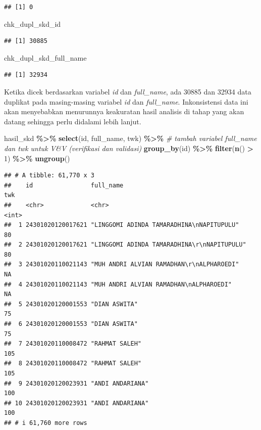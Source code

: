 \documentclass[
]{article}
\newenvironment{Shaded}{\begin{snugshade}}{\end{snugshade}}
\newcommand{\CommentTok}[1]{\textcolor[rgb]{0.56,0.35,0.01}{\textit{#1}}}
\newcommand{\DecValTok}[1]{\textcolor[rgb]{0.00,0.00,0.81}{#1}}
\newcommand{\FunctionTok}[1]{\textcolor[rgb]{0.13,0.29,0.53}{\textbf{#1}}}
\newcommand{\NormalTok}[1]{#1}
\newcommand{\SpecialCharTok}[1]{\textcolor[rgb]{0.81,0.36,0.00}{\textbf{#1}}}
\begin{document}
\begin{verbatim}
## [1] 0
\end{verbatim}

\begin{Shaded}
\begin{Highlighting}[]
\NormalTok{chk\_dupl\_skd\_id}
\end{Highlighting}
\end{Shaded}

\begin{verbatim}
## [1] 30885
\end{verbatim}

\begin{Shaded}
\begin{Highlighting}[]
\NormalTok{chk\_dupl\_skd\_full\_name}
\end{Highlighting}
\end{Shaded}

\begin{verbatim}
## [1] 32934
\end{verbatim}

Ketika dicek berdasarkan variabel \emph{id} dan \emph{full\_name}, ada
30885 dan 32934 data duplikat pada masing-masing variabel \emph{id} dan
\emph{full\_name}. Inkonsistensi data ini akan menyebabkan menurunnya
keakuratan hasil analisis di tahap yang akan datang sehingga perlu
didalami lebih lanjut.

\begin{Shaded}
\begin{Highlighting}[]
\NormalTok{hasil\_skd }\SpecialCharTok{\%\textgreater{}\%} 
  \FunctionTok{select}\NormalTok{(id, full\_name, twk) }\SpecialCharTok{\%\textgreater{}\%} \CommentTok{\# tambah variabel full\_name dan twk untuk V\&V (verifikasi dan validasi)}
  \FunctionTok{group\_by}\NormalTok{(id) }\SpecialCharTok{\%\textgreater{}\%} 
  \FunctionTok{filter}\NormalTok{(}\FunctionTok{n}\NormalTok{() }\SpecialCharTok{\textgreater{}} \DecValTok{1}\NormalTok{) }\SpecialCharTok{\%\textgreater{}\%} 
  \FunctionTok{ungroup}\NormalTok{()}
\end{Highlighting}
\end{Shaded}

\begin{verbatim}
## # A tibble: 61,770 x 3
##    id                full_name                                     twk
##    <chr>             <chr>                                       <int>
##  1 24301020120017621 "LINGGOMI ADINDA TAMARADHINA\nNAPITUPULU"      80
##  2 24301020120017621 "LINGGOMI ADINDA TAMARADHINA\r\nNAPITUPULU"    80
##  3 24301020110021143 "MUH ANDRI ALVIAN RAMADHAN\r\nALPHAROEDI"      NA
##  4 24301020110021143 "MUH ANDRI ALVIAN RAMADHAN\nALPHAROEDI"        NA
##  5 24301020120001553 "DIAN ASWITA"                                  75
##  6 24301020120001553 "DIAN ASWITA"                                  75
##  7 24301020110008472 "RAHMAT SALEH"                                105
##  8 24301020110008472 "RAHMAT SALEH"                                105
##  9 24301020120023931 "ANDI ANDARIANA"                              100
## 10 24301020120023931 "ANDI ANDARIANA"                              100
## # i 61,760 more rows
\end{verbatim}
\end{document}
